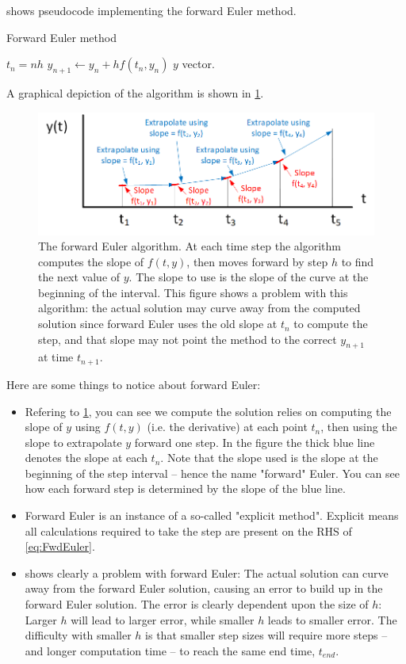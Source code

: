 \documentclass[hidelinks,notitlepage]{book}
\begin{document}
 shows pseudocode implementing the forward Euler method.
\begin{algorithm}
	\caption{Forward Euler method}
	\label{alg:myalgo}
	\begin{algorithmic} 
		\STATE $t_n = n h$
		\STATE $y_{n+1} \leftarrow y_n + h f(t_n, y_n)$
		\ENDFOR
		\RETURN $y$ vector.
	\end{algorithmic}
\end{algorithm}
A graphical depiction of the algorithm is shown in \cref{fig:ForwardEuler}.  
\begin{figure}[tbh]
	\centering
	\includegraphics[width=0.8\columnwidth]{ForwardEuler.png}
	\caption{The forward Euler algorithm.  At each time step the algorithm computes the slope of $f(t, y)$, then moves forward by step $h$ to find the next value of $y$.  The slope to use is the slope of the curve at the beginning of the interval.  This figure shows a problem with this algorithm:  the actual solution may curve away from the computed solution since forward Euler uses the old slope at $t_n$ to compute the step, and that slope may not point the method to the correct $y_{n+1}$ at time $t_{n+1}$.}
	\label{fig:ForwardEuler}
\end{figure}
Here are some things to notice about forward Euler:
\begin{itemize}
	\item Refering to \cref{fig:ForwardEuler}, you can see we compute the solution relies on computing the slope of $y$ using $f(t,y)$ (i.e. the derivative) at each point $t_n$, then using the slope to extrapolate $y$ forward one step.  In the figure the thick blue line denotes the slope at each $t_n$.  Note that the slope used is the slope at the beginning of the step interval -- hence the name "forward" Euler.  You can see how each forward step is determined by the slope of the blue line.
	\item Forward Euler is an instance of a so-called "explicit method".  Explicit means all calculations required to take the step are present on the RHS of \cref{eq:FwdEuler}.
	\item {} shows clearly a problem with forward Euler:  The actual solution can curve away from the forward Euler solution, causing an error to build up in the forward Euler solution.  The error is clearly dependent upon the size of $h$:  Larger $h$ will lead to larger error, while smaller $h$ leads to smaller error.  The difficulty with smaller $h$ is that smaller step sizes will require more steps -- and longer computation time -- to reach the same end time, $t_{end}$.
\end{itemize}
\end{document}

